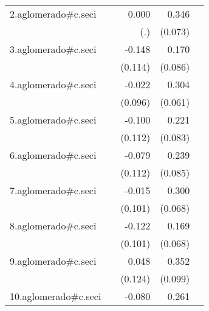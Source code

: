 {\begin{longtable}{l*{4}{D{.}{.}{-1}}}
\addlinespace
2.aglomerado#c.seci&                     &       0.000         &       0.346\sym{***}&                     \\
            &                     &         (.)         &     (0.073)         &                     \\
\addlinespace
3.aglomerado#c.seci&                     &      -0.148         &       0.170\sym{*}  &                     \\
            &                     &     (0.114)         &     (0.086)         &                     \\
\addlinespace
4.aglomerado#c.seci&                     &      -0.022         &       0.304\sym{***}&                     \\
            &                     &     (0.096)         &     (0.061)         &                     \\
\addlinespace
5.aglomerado#c.seci&                     &      -0.100         &       0.221\sym{**} &                     \\
            &                     &     (0.112)         &     (0.083)         &                     \\
\addlinespace
6.aglomerado#c.seci&                     &      -0.079         &       0.239\sym{**} &                     \\
            &                     &     (0.112)         &     (0.085)         &                     \\
\addlinespace
7.aglomerado#c.seci&                     &      -0.015         &       0.300\sym{***}&                     \\
            &                     &     (0.101)         &     (0.068)         &                     \\
\addlinespace
8.aglomerado#c.seci&                     &      -0.122         &       0.169\sym{*}  &                     \\
            &                     &     (0.101)         &     (0.068)         &                     \\
\addlinespace
9.aglomerado#c.seci&                     &       0.048         &       0.352\sym{***}&                     \\
            &                     &     (0.124)         &     (0.099)         &                     \\
\addlinespace
10.aglomerado#c.seci&                     &      -0.080         &       0.261\sym{***}&                     \\

\end{longtable}}
